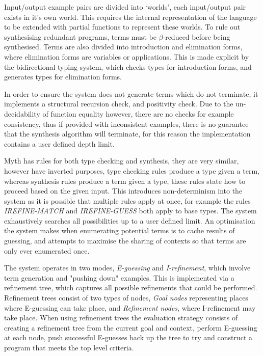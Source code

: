 \documentclass[a4paper]{article}
\begin{document}
Input/output example pairs are divided into `worlds', each input/output pair exists in it's own world. This requires the internal representation 
of the language to be extended with partial functions to represent these worlds. 
To rule out synthesising redundant programs, terms must be \(\beta\)-reduced before being synthesised. Terms are also divided into introduction 
and elimination forms, where elimination forms are variables or applications. This is made explicit by the bidirectional typing system, 
which checks types for introduction forms, and generates types for elimination forms.

In order to ensure the system does not generate terms which do not terminate, it implements a structural recursion check, and positivity check.
Due to the un-decidability of function equality however, there are no checks for example consistency, thus if provided with inconsistent examples, there
is no guarantee that the synthesis algorithm will terminate, for this reason the implementation contains a user defined depth limit. 

Myth has rules for both type checking and synthesis, they are very similar, however have inverted purposes, type checking rules produce a 
type given a term, whereas synthesis rules produce a term given a type, these rules state how to proceed based on the given input. This introduces
non-determinism into the system as it is possible that multiple rules apply at once, for example the rules \emph{IREFINE-MATCH} and \emph{IREFINE-GUESS} both 
apply to base types. The system exhaustively searches all possibilities up to a user defined limit. An optimisation the system makes when enumerating potential 
terms is to cache results of guessing, and attempts to maximise the sharing of contexts so that terms are only ever enumerated once. 

The system operates in two modes, \emph{E-guessing} and \emph{I-refinement}, which involve term generation and "pushing down" examples. This is implemented via a 
refinement tree, which captures all possible refinements that could be performed. Refinement trees consist of two types of nodes, \emph{Goal nodes} representing 
places where E-guessing can take place, and \emph{Refinement nodes}, where I-refinement may take place. When using refinement 
trees the evaluation strategy consists of creating a refinement tree from the current goal and context, perform E-guessing at 
each node, push successful E-guesses back up the tree to try and construct a program that meets the top level criteria. 
\end{document}
